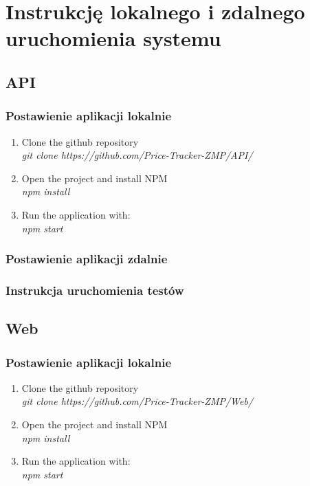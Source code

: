\documentclass{article}
\begin{document}
\section{Instrukcję lokalnego i zdalnego uruchomienia systemu}
    \subsection{API}
        \subsubsection{Postawienie aplikacji lokalnie}
        \begin{enumerate}
            \item Clone the github repository\\
                        \emph{git clone https://github.com/Price-Tracker-ZMP/API/} \\
            \item Open the project and install NPM\\
              \emph{npm install} \\
            \item Run the application with:\\
                \emph{npm start} \\
        \end{enumerate}
        
        \subsubsection{Postawienie aplikacji zdalnie}
        
        \subsubsection{Instrukcja uruchomienia testów}
        
    \subsection{Web}
        \subsubsection{Postawienie aplikacji lokalnie}
        \begin{enumerate}
            \item Clone the github repository\\
                        \emph{git clone https://github.com/Price-Tracker-ZMP/Web/} \\
            \item Open the project and install NPM\\
              \emph{npm install} \\
            \item Run the application with:\\
                \emph{npm start} \\
        \end{enumerate}
        
\end{document}
